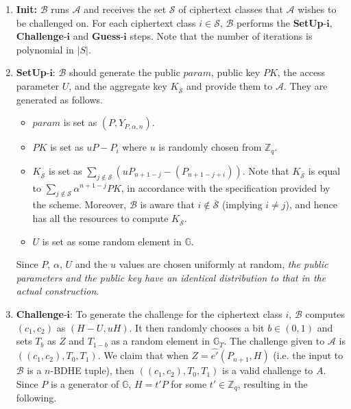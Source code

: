 \begin{enumerate}
 \item \textbf{Init:} $\mathcal{B}$ runs $\mathcal{A}$ and receives the set $\mathcal{S}$ of ciphertext classes that $\mathcal{A}$ wishes to be challenged on. For each ciphertext class $i\in\mathcal{S}$, $\mathcal{B}$ performs the \textbf{SetUp}-$\mathbf{i}$, \textbf{Challenge}-$\mathbf{i}$ and \textbf{Guess}-$\mathbf{i}$ steps. Note that the number of iterations is polynomial in $|S|$. 
 
 \item \textbf{SetUp}-$\mathbf{i}$: $\mathcal{B}$ should generate the public $param$, public key $PK$, the access parameter $U$, and the aggregate key $K_{\overline{\mathcal{S}}}$ and provide them to $\mathcal{A}$. They are generated as follows.
 \vspace{-0.6mm}
 \begin{itemize}
  \item $param$ is set as $(P,Y_{P,\alpha,n})$.
  \item $PK$ is set as $uP - P_i$ where $u$ is randomly chosen from $\mathbb{Z}_q$.
  \item $K_{\overline{\mathcal{S}}}$ is set as $\sum_{j\notin\mathcal{S}}({u}P_{n+1-j}-(P_{n+1-j+i}))$. Note that $K_{\overline{\mathcal{S}}}$ is equal to $\sum_{j\notin\mathcal{S}}\alpha^{n+1-j}PK$, in accordance with the specification provided by the scheme. Moreover, $\mathcal{B}$ is aware that $i\notin \overline{\mathcal{S}}$ (implying $i\neq j$), and hence has all the resources to compute $K_{\overline{\mathcal{S}}}$.
  \item $U$ is set as some random element in $\mathbb{G}$.
 \end{itemize}
 
 Since $P$, $\alpha$, $U$ and the $u$ values are chosen uniformly at random, \emph{the public parameters and the public key have an identical distribution to that in the actual construction}.
 
 \item \textbf{Challenge}-$\mathbf{i}$: To generate the challenge for the ciphertext class $i$, $\mathcal{B}$ computes $(c_1,c_2)$ as $(H-U,uH)$. It then randomly chooses a bit $b\in{(0,1)}$ and sets $T_b$ as $Z$ and $T_{1-b}$ as a random element in $\mathbb{G}_T$. The challenge given to $\mathcal{A}$ is $((c_1,c_2),T_0,T_1)$.  We claim that when $Z=\hat{e'}(P_{n+1},H)$ (i.e. the input to $\mathcal{B}$ is a $n$-BDHE tuple), then $((c_1,c_2),T_0,T_1)$ is a valid challenge to $A$. Since $P$ is a generator of $\mathbb{G}$, $H=t'P$ for some $t'\in\mathbb{Z}_q$, resulting in the following.


\end{enumerate}

